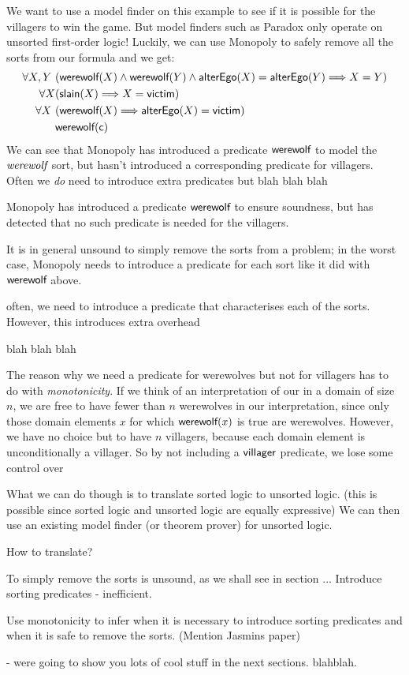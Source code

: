 We want to use a model finder on this example to see if it is possible
for the villagers to win the game. But model finders such as Paradox
only operate on unsorted first-order logic! Luckily, we can use
Monopoly to safely remove all the sorts from our formula and we get:
\begin{align*}
\forall X, Y \ & ( \mbox {\sf werewolf}(X) \land \mbox {\sf werewolf}(Y) \land \mbox {\sf alterEgo}(X) = \mbox {\sf alterEgo}(Y) \Longrightarrow X = Y) \\
\forall X & (\mbox {\sf slain}(X) \Longrightarrow X = \mbox{\sf victim}) \\
\forall X \ & (\mbox {\sf werewolf}(X) \Longrightarrow \mbox {\sf alterEgo}(X) = \mbox{\sf victim}) \\
& \mbox {\sf werewolf}(\mbox{\sf c})
\end{align*}
We can see that Monopoly has introduced a predicate $\mbox {\sf werewolf}$ to
model the $\textit{werewolf}$ sort, but hasn't introduced a corresponding
predicate for villagers. Often we \emph{do} need to introduce extra
predicates but blah blah blah

Monopoly has introduced a predicate $\mbox {\sf werewolf}$ to ensure soundness,
but has detected that no such predicate is needed for the villagers.

It is in general unsound to simply remove the sorts from a problem;
in the worst case, Monopoly needs to introduce a predicate for each
sort like it did with $\mbox {\sf werewolf}$ above. 

often, we need to introduce a predicate that characterises each of the
sorts. However, this introduces extra overhead 

blah blah blah

The reason why we need a predicate for werewolves but not for
villagers has to do with \emph{monotonicity}. If we think of an
interpretation of our in a domain of size $n$, we are free to have
fewer than $n$ werewolves in our interpretation, since only those
domain elements $x$ for which $\mbox {\sf werewolf}(x)$ is true are
werewolves. However, we have no choice but to have $n$ villagers,
because each domain element is unconditionally a villager. So by not
including a $\mbox {\sf villager}$ predicate, we lose some control over

What we can do though is to translate sorted logic to unsorted logic. 
(this is possible since sorted logic and unsorted logic are equally expressive) 
We can then use an existing model finder (or theorem prover) for unsorted logic.

How to translate?

To simply remove the sorts is unsound, as we shall see in section ...
Introduce sorting predicates - inefficient.

Use monotonicity to infer when it is necessary to introduce sorting predicates
and when it is safe to remove the sorts. (Mention Jasmins paper)

- were going to show you lots of cool stuff in the next sections. blahblah.













